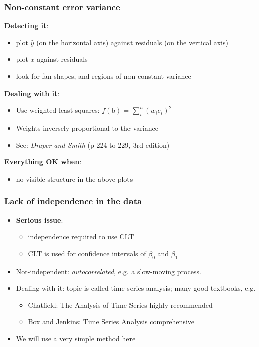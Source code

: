 \begin{frame}\frametitle{Non-constant error variance}

	\textbf{Detecting it}:
	\begin{itemize}
		\item	plot $\hat{y}$ {\scriptsize (on the horizontal axis)} against residuals {\scriptsize (on the vertical axis)}
		\item	plot $x$ against residuals
		\item	look for fan-shapes, and regions of non-constant variance
	\end{itemize}

	\textbf{Dealing with it}:
	\begin{itemize}
		\item	Use weighted least squares: $f(\mathrm{b}) = \sum_i^n{(w_ie_i)^2}$
		\item	Weights inversely proportional to the variance
		\item	See: \emph{Draper and Smith} (p 224 to 229, 3rd edition)
	\end{itemize}

	\textbf{Everything OK when}:
	\begin{itemize}
		\item	no visible structure in the above plots
	\end{itemize}
\end{frame}

\begin{frame}\frametitle{Lack of independence in the data}
	\begin{itemize}
		\item	\textbf{Serious issue}:
		\begin{itemize}
			\item	independence required to use CLT
			\item	CLT is used for confidence intervals of $\beta_0$ and $\beta_1$
		\end{itemize}
		\item	Not-independent: \emph{autocorrelated}, e.g. a slow-moving process.
		\item	Dealing with it: topic is called time-series analysis; many good textbooks, e.g. 
			\begin{itemize}
				\item	Chatfield: {\scriptsize The Analysis of Time Series} \hfill {\color{myOrange}{$\longleftarrow$}highly recommended}
				\item	Box and Jenkins: {\scriptsize Time Series Analysis} \hfill {\color{myOrange}{$\longleftarrow$}comprehensive}
			\end{itemize}
		\item	We will use a very simple method here
	\end{itemize}
\end{frame}

